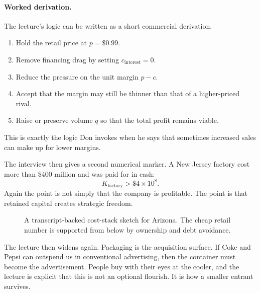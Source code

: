\paragraph{Worked derivation.} The lecture's logic can be written as a short commercial derivation.
\begin{enumerate}
\item Hold the retail price at \(p=\$0.99\).
\item Remove financing drag by setting \(c_{\mathrm{interest}}=0\).
\item Reduce the pressure on the unit margin \(p-c\).
\item Accept that the margin may still be thinner than that of a higher-priced rival.
\item Raise or preserve volume \(q\) so that the total profit remains viable.
\end{enumerate}
This is exactly the logic Don invokes when he says that sometimes increased sales can make up for lower margins.

The interview then gives a second numerical marker. A New Jersey factory cost more than \$400 million and was paid for in cash:
\begin{equation}
K_{\mathrm{factory}}>\$4\times 10^8.
\end{equation}
Again the point is not simply that the company is profitable. The point is that retained capital creates strategic freedom.

\begin{figure}
\centering
{}
\caption{A transcript-backed cost-stack sketch for Arizona. The cheap retail number is supported from below by ownership and debt avoidance.}
\end{figure}

The lecture then widens again. Packaging is the acquisition surface. If Coke and Pepsi can outspend us in conventional advertising, then the container must become the advertisement. People buy with their eyes at the cooler, and the lecture is explicit that this is not an optional flourish. It is how a smaller entrant survives.

